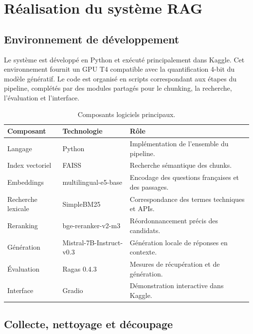 \documentclass[12pt,a4paper,oneside]{report}
\begin{document}
\chapter{Réalisation du système RAG}
\label{chap:realisation}

\section{Environnement de développement}

Le système est développé en Python et exécuté principalement dans Kaggle. Cet
environnement fournit un GPU T4 compatible avec la quantification 4-bit du
modèle génératif. Le code est organisé en scripts correspondant aux étapes du
pipeline, complétés par des modules partagés pour le chunking, la recherche,
l'évaluation et l'interface.

\begin{table}[H]
\centering
\caption{Composants logiciels principaux.}
\label{tab:outils}
\begin{tabularx}{\textwidth}{p{3.5cm}Y Y}
\toprule
\textbf{Composant} & \textbf{Technologie} & \textbf{Rôle}\\
\midrule
Langage & Python & Implémentation de l'ensemble du pipeline.\\
Index vectoriel & FAISS & Recherche sémantique des chunks.\\
Embeddings & multilingual-e5-base & Encodage des questions françaises et des passages.\\
Recherche lexicale & SimpleBM25 & Correspondance des termes techniques et APIs.\\
Reranking & bge-reranker-v2-m3 & Réordonnancement précis des candidats.\\
Génération & Mistral-7B-Instruct-v0.3 & Génération locale de réponses en contexte.\\
Évaluation & Ragas 0.4.3 & Mesures de récupération et de génération.\\
Interface & Gradio & Démonstration interactive dans Kaggle.\\
\bottomrule
\end{tabularx}
\end{table}

\section{Collecte, nettoyage et découpage}
\end{document}
